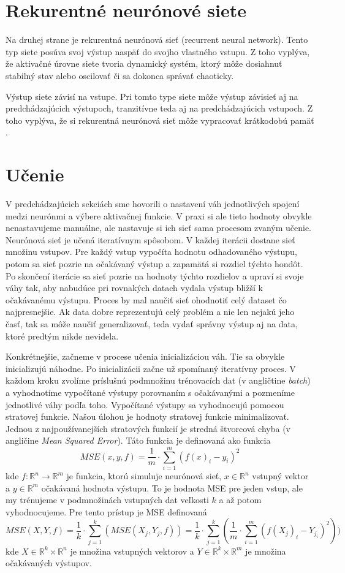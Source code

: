 \section{Rekurentné neurónové siete}
Na druhej strane je rekurentná neurónová sieť (recurrent neural network).
Tento typ siete posúva svoj výstup naspäť do svojho vlastného vstupu. 
Z toho vyplýva, že aktivačné úrovne siete tvoria dynamický systém, ktorý môže dosiahnuť stabilný stav alebo oscilovať či sa dokonca správať chaoticky.

Výstup siete závisí na vstupe. 
Pri tomto type siete môže výstup závisieť aj na predchádzajúcich výstupoch, tranzitívne teda aj na predchádzajúcich vstupoch.
Z toho vyplýva, že si rekurentná neurónová sieť môže vypracovať krátkodobú pamäť \citep{aima}.

\section{Učenie}
V predchádzajúcich sekciách sme hovorili o nastavení váh jednotlivých spojení medzi neurónmi a výbere aktivačnej funkcie.
V praxi si ale tieto hodnoty obvykle nenastavujeme manuálne, ale nastavuje si ich sieť sama procesom zvaným učenie. Neurónová sieť je učená iteratívnym spôsobom. 
V každej iterácii dostane sieť množinu vstupov.
Pre každý vstup vypočíta hodnotu odhadovaného výstupu, potom sa sieť pozrie na očakávaný výstup a zapamätá si rozdiel týchto hondôt.
Po skončení iterácie sa sieť pozrie na hodnoty týchto rozdielov a upraví si svoje váhy tak, aby nabudúce pri rovnakých datach vydala výstup bližší k očakávanému výstupu.
Proces by mal naučiť sieť ohodnotiť celý dataset čo najpresnejšie.
Ak data dobre reprezentujú celý problém a nie len nejakú jeho časť, tak sa môže naučiť generalizovať, teda vydať správny výstup aj na data, ktoré predtým nikde nevidela.

Konkrétnejšie, začneme v procese učenia inicializáciou váh. Tie sa obvykle inicializujú náhodne.
Po inicializácii začne už spomínaný iteratívny proces.
V každom kroku zvolíme príslušnú podmnožinu trénovacích dat (v angličtine \textit{batch}) a vyhodnotíme vypočítané výstupy porovnaním s očakávanými a pozmeníme jednotlivé váhy podľa toho.
Vypočítané výstupy sa vyhodnocujú pomocou stratovej funkcie.
Našou úlohou je hodnoty stratovej funkcie minimalizovať.
Jednou z najpoužívanejších stratových funkcií je stredná štvorcová chyba (v angličine \textit{Mean Squared Error}). Táto funkcia je definovaná ako funkcia $$MSE(x,y,f) = \frac{1}{m} \cdot \sum_{i=1}^m (f(x)_i - y_i)^2$$
kde
$f: \mathbb{R}^n \to \mathbb{R}^m$ je funkcia, ktorú simuluje neurónová sieť, $x \in \mathbb{R}^n$ vstupný vektor a $y \in \mathbb{R}^m$ očakávaná hodnota výstupu.
To je hodnota MSE pre jeden vstup, ale my trénujeme v podmnožinách vstupných dat veľkosti $k$ a až potom vyhodnocujeme. 
Pre tento prístup je MSE definovaná $$MSE(X,Y,f) = \frac{1}{k} \cdot \sum_{j=1}^k (MSE(X_j,Y_j,f)) = \frac{1}{k} \cdot \sum_{j=1}^k (\frac{1}{m} \cdot \sum_{i=1}^m  (f(X_j)_i - Y_{j_i})^2)) $$
kde $X \in \mathbb{R}^k \times \mathbb{R}^n$ je množina vstupných vektorov a $Y \in \mathbb{R}^k \times \mathbb{R}^m$ je množina očakávaných výstupov.

